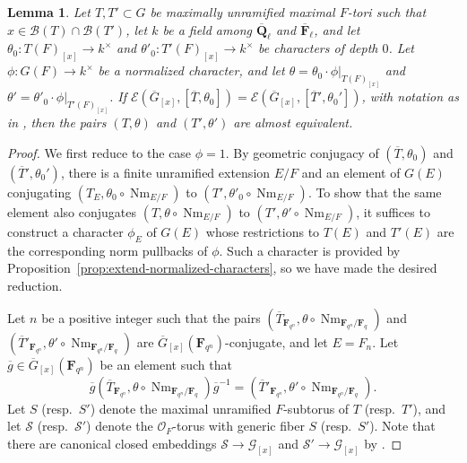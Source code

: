 \documentclass[reqno]{amsart}
\numberwithin{equation}{subsection}
\newcommand{\F}{\mathbf{F}}
\newcommand{\Q}{\mathbf{Q}}
\newcommand{\ol}[1]{\overline{#1}}
\newcommand{\co}{\colon}
\newcommand\cB{\mathcal{B}}
\newcommand\cE{\mathcal{E}}
\newcommand\cG{\mathcal{G}}
\newcommand\cO{\mathcal{O}}
\newcommand\cS{\mathcal{S}}
\DeclareMathOperator{\Nm}{Nm}
\newtheorem{lemma}[thm]{Lemma}
\theoremstyle{remark}
\numberwithin{equation}{subsection}
\numberwithin{figure}{subsection}
\begin{document}
\begin{lemma}\label{lemma:conjugacy-of-torus-character-pairs}
Let $T, T' \subset G$ be maximally unramified maximal $F$-tori such that $x \in \cB(T) \cap \cB(T')$, let $k$ be a field among $\ol\Q_\ell$ and $\ol\F_\ell$, and let $\theta_0\co T(F)_{[x]} \to k^\times$ and $\theta'_0\co T'(F)_{[x]} \to k^\times$ be characters of depth $0$. Let $\phi\co G(F) \to k^\times$ be a normalized character, and let $\theta = \theta_0 \cdot \phi|_{T(F)_{[x]}}$ and $\theta' = \theta'_0 \cdot \phi|_{T'(F)_{[x]}}$. If $\cE(\ol G_{[x]}, [\ol T, \theta_0]) = \cE(\ol G_{[x]}, [\ol T', \theta_0'])$, with notation as in \cite[Definition~2.8.2]{Cot26b}, then the pairs $(T, \theta)$ and $(T', \theta')$ are almost equivalent.
\end{lemma}

\begin{proof}
We first reduce to the case $\phi=1$. By geometric conjugacy of $(\ol T, \theta_0)$ and $(\ol T', \theta_0')$, there is a finite unramified extension $E/F$ and an element of $G(E)$ conjugating $(T_E,\theta_0 \circ \Nm_{E/F})$ to $(T',\theta'_0 \circ \Nm_{E/F})$. To show that the same element also conjugates $(T,\theta \circ \Nm_{E/F})$ to $(T',\theta' \circ \Nm_{E/F})$, it suffices to construct a character $\phi_E$ of $G(E)$ whose restrictions to $T(E)$ and $T'(E)$ are the corresponding norm pullbacks of $\phi$. Such a character is provided by Proposition~\ref{prop:extend-normalized-characters}, so we have made the desired reduction.

Let $n$ be a positive integer such that the pairs $(\ol T_{\F_{q^n}}, \theta \circ \Nm_{\F_{q^n}/\F_q})$ and $(\ol T'_{\F_{q^n}}, \theta' \circ \Nm_{\F_{q^n}/\F_q})$ are $\ol G_{[x]}(\F_{q^n})$-conjugate, and let $E = F_n$. Let $\ol g \in \ol G_{[x]}(\F_{q^n})$ be an element such that
\[
\ol g(\ol T_{\F_{q^n}}, \theta \circ \Nm_{\F_{q^n}/\F_q})\ol g^{-1} = (\ol T'_{\F_{q^n}}, \theta' \circ \Nm_{\F_{q^n}/\F_q}).
\]
Let $S$ (resp.\ $S'$) denote the maximal unramified $F$-subtorus of $T$ (resp.\ $T'$), and let $\cS$ (resp.\ $\cS'$) denote the $\cO_F$-torus with generic fiber $S$ (resp.\ $S'$). Note that there are canonical closed embeddings $\cS \to \cG_{[x]}$ and $\cS' \to \cG_{[x]}$ by \cite[Axiom 4.1.20]{KP}.


\end{proof}
\end{document}
